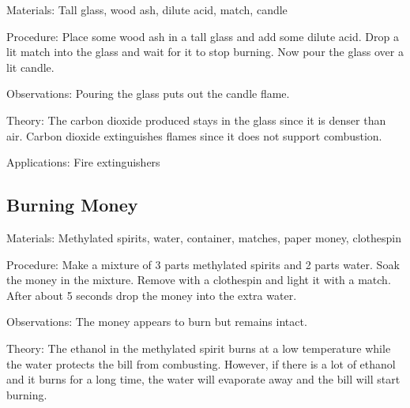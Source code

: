 \begin{multicols}{2}
\begin{description*}
\item[Materials:]{Tall glass, wood ash, dilute acid, match, candle}
\item[Procedure:]{Place some wood ash in a tall glass and add some dilute acid. Drop a lit match into the glass and wait for it to stop burning. Now pour the glass over a lit candle.}
\item[Observations:]{Pouring the glass puts out the candle flame.}
\item[Theory:]{The carbon dioxide produced stays in the
glass since it is denser than air. Carbon dioxide
extinguishes flames since it does not support
combustion.}
\item[Applications:]{Fire extinguishers}
\end{description*}

\subsection{Burning Money}


\begin{description*}
\item[Materials:]{Methylated spirits, water, container, matches, paper money, clothespin}
\item[Procedure:]{Make a mixture of 3 parts methylated spirits and 2 parts water. Soak the money in the mixture. Remove with a clothespin and light it with a match. After about 5 seconds drop the money into the extra water.}
\item[Observations:]{The money appears to burn but remains intact.}
\item[Theory:]{The ethanol in the methylated spirit burns at a low temperature while the water protects the bill from combusting. However, if there is a lot of ethanol and it burns for a long time, the water will evaporate away and the bill will start burning.}
\end{description*}


\end{multicols}
